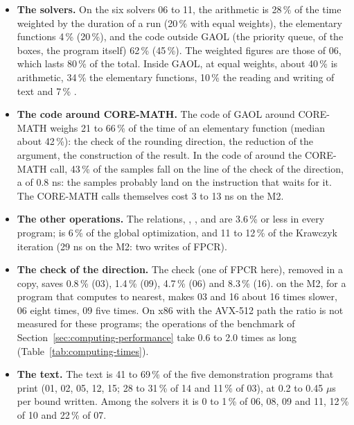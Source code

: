 \begin{itemize}
\item[$\bullet$] \textbf{The solvers.} On the six solvers 06 to 11, the
arithmetic is 28\,\% of the time weighted by the duration of a run (20\,\%
with equal weights), the elementary functions 4\,\% (20\,\%), and the code
outside GAOL (the priority queue,  of the boxes, the program
itself) 62\,\% (45\,\%). The weighted figures are those of 06, which lasts
80\,\% of the total. Inside GAOL, at equal weights, about 40\,\% is
arithmetic, 34\,\% the elementary functions, 10\,\% the reading and writing
of text and 7\,\% .
\item[$\bullet$] \textbf{The code around CORE-MATH.} The code of GAOL around
CORE-MATH weighs 21 to 66\,\% of the time of an elementary function (median
about 42\,\%): the check of the rounding direction, the reduction of the
argument, the construction of the result. In the code of  around
the CORE-MATH call, 43\,\% of the samples fall on the line of the check of
the direction, a  of 0.8 ns: the samples probably land on the
instruction that waits for it. The CORE-MATH calls themselves cost 3 to
13 ns on the M2.
\item[$\bullet$] \textbf{The other operations.} The relations, ,
,  and  are 3.6\,\% or less in every
program;  is 6\,\% of the global optimization, and
 11 to 12\,\% of the Krawczyk iteration (29 ns on the
M2: two writes of FPCR).
\item[$\bullet$] \textbf{The check of the direction.} The check (one
 of FPCR here), removed in a copy, saves 0.8\,\% (03), 1.4\,\%
(09), 4.7\,\% (06) and 8.3\,\% (16).  on the
M2, for a program that computes to nearest, makes 03 and 16 about 16 times
slower, 06 eight times, 09 five times. On x86 with the AVX-512 path the
ratio is not measured for these programs; the operations of the benchmark of Section~\ref{sec:computing-performance} take 0.6 to 2.0 times as long (Table~\ref{tab:computing-times}).
\item[$\bullet$] \textbf{The text.} The text is 41 to 69\,\% of the five
demonstration programs that print (01, 02, 05, 12, 15; 28 to 31\,\% of 14 and
11\,\% of 03), at 0.2 to 0.45 $\mu$s per bound written. Among the solvers it
is 0 to 1\,\% of 06, 08, 09 and 11, 12\,\% of 10 and 22\,\% of 07.
\end{itemize}


